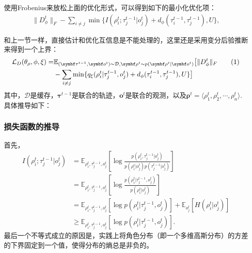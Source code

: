 使用Frobenius来放松上面的优化形式，可以得到如下的最小化优化项：
\begin{equation}
\begin{aligned}
    \|D_\phi^t\|_{F} - \sum_{i\ne j}\min\{I(\rho^{t}_i; \tau^{t-1}_j|o^t_j) + d_\phi(\tau^{t-1}_i, \tau^{t-1}_j), U\},
\end{aligned}
\end{equation}

和上一节一样，直接估计和优化互信息是不能处理的，这里还是采用变分后验推断来得到一个上界：
\begin{align*}
    \mathcal{L}_D(\theta_\rho, \phi, \xi) = &\mathbb{E}_{(\bm{\tau}^{t-1}, \bm{o}^t)\sim\mathcal{D}, \bm{\rho}^t\sim p(\bm{\rho}^t | \bm{o}^t)}\big[\|D_\phi^t\|_{F} \stepcounter{equation}\tag{\theequation} \\ 
        & - \sum_{i\ne j}\min\{q_\xi(\rho^{t}_i| \tau^{t-1}_j, o^t_j) + d_\phi(\tau^{t-1}_i, \tau^{t-1}_j), U\}\big]
\end{align*}
其中，$\mathcal{D}$是缓存，$\bm{\tau}^{t-1}$是联合的轨迹，$\bm{o}^{t}$是联合的观测，以及$\bm{\rho}^{t}=\langle \rho_1^t, \rho_2^t, \cdots, \rho_n^t\rangle$. 具体推导如下：

\subsubsection{损失函数的推导}
首先，
\begin{equation}
    \begin{aligned}
    I(\rho^{t}_i; \tau^{t-1}_j | o^t_j) &= \mathbb{E}_{\rho^{t}_i, \tau^{t-1}_j, o^t_j}\left[\log\frac{p(\rho^{t}_i, \tau^{t-1}_j | o^t_j)}{p(\rho^{t}_i | o^t_j)p(\tau^{t-1}_j | o^t_j)}\right] \\
    &= \mathbb{E}_{\rho^{t}_i, \tau^{t-1}_j, o^t_j}\left[\log\frac{p(\rho^{t}_i| \tau^{t-1}_j, o^t_j)}{p(\rho^{t}_i | o^t_j)}\right] \\
    &= \mathbb{E}_{\rho^{t}_i, \tau^{t-1}_j, o^t_j}\left[\log p(\rho^{t}_i| \tau^{t-1}_j, o^t_j)\right] + \mathbb{E}_{o^t_j}\left[H(\rho^{t}_i | o^t_j)\right]\\
    &\ge \mathbb{E}_{\rho^{t}_i, \tau^{t-1}_j, o^t_j}\left[\log p(\rho^{t}_i| \tau^{t-1}_j, o^t_j)\right].
    \end{aligned}
\end{equation}
最后一个不等式成立的原因是，实践上将角色分布（即一个多维高斯分布）的方差的下界固定到一个值，使得分布的熵总是非负的。

